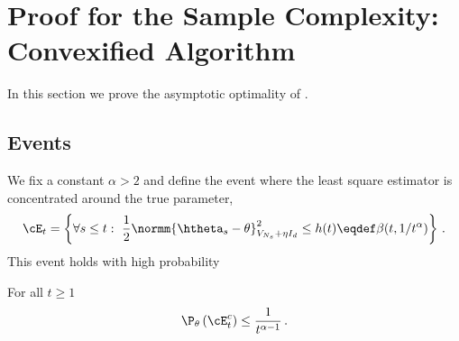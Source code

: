 \section{Proof for the Sample Complexity: Convexified Algorithm}\label{app:lgc.proof}

In this section we prove the asymptotic optimality of \LGC.
\subsection{Events}\label{app:proof.events}
We fix a constant $\alpha>2$ and define the event where the least square estimator is concentrated around the true parameter,
\[
\cE_t = \left\{\forall s \leq  t:\ \frac{1}{2}\normm{\htheta_s-\theta}^2_{V_{N_s}+\eta I_d} \leq h(t)\eqdef \beta(t,1/t^\alpha)\right\}\,.
\]
This event holds with high probability
\begin{lemma}
\label{lem:prb_Et}
For all $t \geq 1$
\[
\P_\theta\left(\cE_t^c\right)\leq \frac{1}{t^{\alpha-1}}\,.
\]
\end{lemma}

